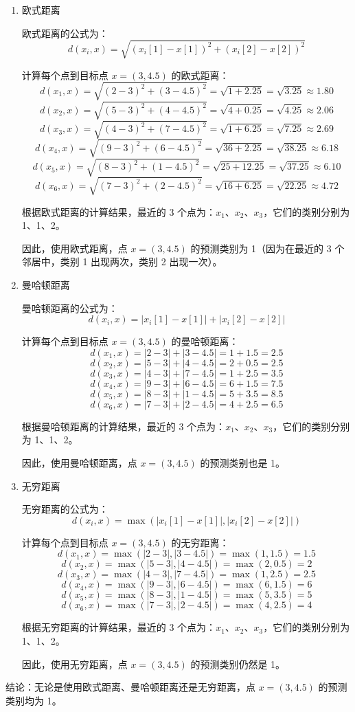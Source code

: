 \documentclass[UTF8]{ctexart}
\begin{document}
	\begin{enumerate}
		\item 欧式距离
		
		欧式距离的公式为：
		\[
		d(x_i, x) = \sqrt{(x_i[1] - x[1])^2 + (x_i[2] - x[2])^2}
		\]
		
		计算每个点到目标点 $x=(3,4.5)$ 的欧式距离：
		\[
		d(x_1, x) = \sqrt{(2 - 3)^2 + (3 - 4.5)^2} = \sqrt{1 + 2.25} = \sqrt{3.25} \approx 1.80
		\]
		\[
		d(x_2, x) = \sqrt{(5 - 3)^2 + (4 - 4.5)^2} = \sqrt{4 + 0.25} = \sqrt{4.25} \approx 2.06
		\]
		\[
		d(x_3, x) = \sqrt{(4 - 3)^2 + (7 - 4.5)^2} = \sqrt{1 + 6.25} = \sqrt{7.25} \approx 2.69
		\]
		\[
		d(x_4, x) = \sqrt{(9 - 3)^2 + (6 - 4.5)^2} = \sqrt{36 + 2.25} = \sqrt{38.25} \approx 6.18
		\]
		\[
		d(x_5, x) = \sqrt{(8 - 3)^2 + (1 - 4.5)^2} = \sqrt{25 + 12.25} = \sqrt{37.25} \approx 6.10
		\]
		\[
		d(x_6, x) = \sqrt{(7 - 3)^2 + (2 - 4.5)^2} = \sqrt{16 + 6.25} = \sqrt{22.25} \approx 4.72
		\]
		
		根据欧式距离的计算结果，最近的 3 个点为：$x_1$、$x_2$、$x_3$，它们的类别分别为 1、1、2。
		
		因此，使用欧式距离，点 $x=(3,4.5)$ 的预测类别为 1（因为在最近的 3 个邻居中，类别 1 出现两次，类别 2 出现一次）。
		
		\item 曼哈顿距离
		
		曼哈顿距离的公式为：
		\[
		d(x_i, x) = |x_i[1] - x[1]| + |x_i[2] - x[2]|
		\]
		
		计算每个点到目标点 $x=(3,4.5)$ 的曼哈顿距离：
		\[
		d(x_1, x) = |2 - 3| + |3 - 4.5| = 1 + 1.5 = 2.5
		\]
		\[
		d(x_2, x) = |5 - 3| + |4 - 4.5| = 2 + 0.5 = 2.5
		\]
		\[
		d(x_3, x) = |4 - 3| + |7 - 4.5| = 1 + 2.5 = 3.5
		\]
		\[
		d(x_4, x) = |9 - 3| + |6 - 4.5| = 6 + 1.5 = 7.5
		\]
		\[
		d(x_5, x) = |8 - 3| + |1 - 4.5| = 5 + 3.5 = 8.5
		\]
		\[
		d(x_6, x) = |7 - 3| + |2 - 4.5| = 4 + 2.5 = 6.5
		\]
		
		根据曼哈顿距离的计算结果，最近的 3 个点为：$x_1$、$x_2$、$x_3$，它们的类别分别为 1、1、2。
		
		因此，使用曼哈顿距离，点 $x=(3,4.5)$ 的预测类别也是 1。
		
		\item 无穷距离
		
		无穷距离的公式为：
		\[
		d(x_i, x) = \max(|x_i[1] - x[1]|, |x_i[2] - x[2]|)
		\]
		
		计算每个点到目标点 $x=(3,4.5)$ 的无穷距离：
		\[
		d(x_1, x) = \max(|2 - 3|, |3 - 4.5|) = \max(1, 1.5) = 1.5
		\]
		\[
		d(x_2, x) = \max(|5 - 3|, |4 - 4.5|) = \max(2, 0.5) = 2
		\]
		\[
		d(x_3, x) = \max(|4 - 3|, |7 - 4.5|) = \max(1, 2.5) = 2.5
		\]
		\[
		d(x_4, x) = \max(|9 - 3|, |6 - 4.5|) = \max(6, 1.5) = 6
		\]
		\[
		d(x_5, x) = \max(|8 - 3|, |1 - 4.5|) = \max(5, 3.5) = 5
		\]
		\[
		d(x_6, x) = \max(|7 - 3|, |2 - 4.5|) = \max(4, 2.5) = 4
		\]
		
		根据无穷距离的计算结果，最近的 3 个点为：$x_1$、$x_2$、$x_3$，它们的类别分别为 1、1、2。
		
		因此，使用无穷距离，点 $x=(3,4.5)$ 的预测类别仍然是 1。
	\end{enumerate}
	结论：无论是使用欧式距离、曼哈顿距离还是无穷距离，点 $x=(3,4.5)$ 的预测类别均为 1。
	
\end{document}
